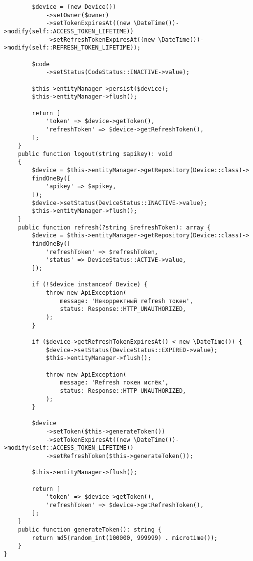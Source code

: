 \documentclass[pract]{SCWorks}
\begin{document}
\begin{verbatim}
        $device = (new Device())
            ->setOwner($owner)
            ->setTokenExpiresAt((new \DateTime())->modify(self::ACCESS_TOKEN_LIFETIME))
            ->setRefreshTokenExpiresAt((new \DateTime())->modify(self::REFRESH_TOKEN_LIFETIME));
        
        $code
            ->setStatus(CodeStatus::INACTIVE->value);

        $this->entityManager->persist($device);
        $this->entityManager->flush();

        return [
            'token' => $device->getToken(),
            'refreshToken' => $device->getRefreshToken(),
        ];
    }
    public function logout(string $apikey): void
    {
        $device = $this->entityManager->getRepository(Device::class)->
        findOneBy([
            'apikey' => $apikey,
        ]);
        $device->setStatus(DeviceStatus::INACTIVE->value);
        $this->entityManager->flush();
    }
    public function refresh(?string $refreshToken): array {
        $device = $this->entityManager->getRepository(Device::class)->
        findOneBy([
            'refreshToken' => $refreshToken,
            'status' => DeviceStatus::ACTIVE->value,
        ]);

        if (!$device instanceof Device) {
            throw new ApiException(
                message: 'Некорректный refresh токен',
                status: Response::HTTP_UNAUTHORIZED,
            );
        }

        if ($device->getRefreshTokenExpiresAt() < new \DateTime()) {
            $device->setStatus(DeviceStatus::EXPIRED->value);
            $this->entityManager->flush();

            throw new ApiException(
                message: 'Refresh токен истёк',
                status: Response::HTTP_UNAUTHORIZED,
            );
        }

        $device
            ->setToken($this->generateToken())
            ->setTokenExpiresAt((new \DateTime())->modify(self::ACCESS_TOKEN_LIFETIME))
            ->setRefreshToken($this->generateToken());

        $this->entityManager->flush();

        return [
            'token' => $device->getToken(),
            'refreshToken' => $device->getRefreshToken(),
        ];
    }
    public function generateToken(): string {
        return md5(random_int(100000, 999999) . microtime());
    }
}
\end{verbatim}
\end{document}
